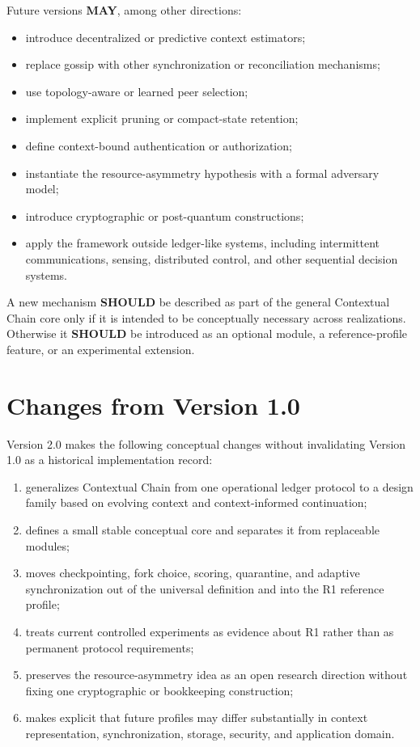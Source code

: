 \documentclass[11pt]{article}
\begin{document}
Future versions \textbf{MAY}, among other directions:
\begin{itemize}
  \item introduce decentralized or predictive context estimators;
  \item replace gossip with other synchronization or reconciliation mechanisms;
  \item use topology-aware or learned peer selection;
  \item implement explicit pruning or compact-state retention;
  \item define context-bound authentication or authorization;
  \item instantiate the resource-asymmetry hypothesis with a formal adversary model;
  \item introduce cryptographic or post-quantum constructions;
  \item apply the framework outside ledger-like systems, including intermittent communications,
  sensing, distributed control, and other sequential decision systems.
\end{itemize}

A new mechanism \textbf{SHOULD} be described as part of the general Contextual Chain core only
if it is intended to be conceptually necessary across realizations. Otherwise it \textbf{SHOULD}
be introduced as an optional module, a reference-profile feature, or an experimental extension.

\section{Changes from Version 1.0}
Version 2.0 makes the following conceptual changes without invalidating Version 1.0 as a
historical implementation record:
\begin{enumerate}
  \item generalizes Contextual Chain from one operational ledger protocol to a design family based on evolving context and context-informed continuation;
  \item defines a small stable conceptual core and separates it from replaceable modules;
  \item moves checkpointing, fork choice, scoring, quarantine, and adaptive synchronization out of the universal definition and into the R1 reference profile;
  \item treats current controlled experiments as evidence about R1 rather than as permanent protocol requirements;
  \item preserves the resource-asymmetry idea as an open research direction without fixing one cryptographic or bookkeeping construction;
  \item makes explicit that future profiles may differ substantially in context representation, synchronization, storage, security, and application domain.
\end{enumerate}
\end{document}
